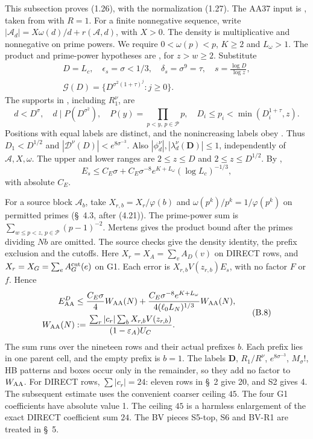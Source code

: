 This subsection proves (1.26), with the normalization (1.27).
The AA37 input is \cite[Theorem~2.6, (2.30)--(2.33b)]{Z1},
taken from \cite[Theorem~4]{ref5} with $R=1$.
For a finite nonnegative sequence, write
$|\mathcal A_d|=X\omega(d)/d+r(\mathcal A,d)$, with $X>0$.
The density is multiplicative and nonnegative on prime powers.
We require $0<\omega(p)<p$, $K\ge2$ and $L_\omega>1$.
The product and prime-power hypotheses are \cite[(2.24), (2.27)]{Z1}, for $z>w\ge2$.
Substitute
\[
 \begin{gathered}
 D=L_c,\quad\epsilon_s=\sigma<1/3,\quad\delta_s=\sigma^9=\tau,\quad s=\frac{\log D}{\log z},\\
 \mathcal G(D)=\{D^{\sigma^2(1+\tau)^j}:j\ge0\}.
 \end{gathered}
\]
The supports in \cite[(2.32)--(2.33)]{Z1}, including $R_1^\nu$, are
\[
 d<D^\sigma,\quad d\mid P(D^{\sigma^2}),\quad
 P(y)=\prod_{p<y,\,p\in\mathcal P}p,\quad
 D_i\le p_i<\min(D_i^{1+\tau},z).
\]
Positions with equal labels are distinct,
and the nonincreasing labels obey \cite[(2.29)]{Z1}.
Thus $D_1<D^{1/2}$ and $|\mathcal D^\nu(D)|<e^{8\sigma^{-3}}$.
Also $|\phi_d^\nu|,|\lambda_d^\nu(\mathbf D)|\le1$, independently of $\mathcal A,X,\omega$.
The upper and lower ranges are $2\le z\le D$ and $2\le z\le D^{1/2}$.
By \cite[(2.31)]{Z1},
\[
 E_s\le C_E\sigma+C_E\sigma^{-8}e^{K+L_\omega}(\log L_c)^{-1/3},
\]
with absolute $C_E$.

For a source block $\mathcal A_b$, take $X_{r,b}=X_r/\varphi(b)$ and
$\omega(p^k)/p^k=1/\varphi(p^k)$ on permitted primes (\S~4.3, after (4.21)).
The prime-power sum is $\sum_{w\le p<z,\,p\in\mathcal P}(p-1)^{-2}$.
Mertens gives the product bound after the primes dividing $Nb$ are omitted.
The source checks give the density identity, the prefix exclusion and the cutoffs.
Here $X_r=X_A=\sum_vA_D(v)$ on DIRECT rows,
and $X_r=X_G=\sum_eA_G^{\rm cut}(e)$ on G1.
Each error is $X_{r,b}V(z_{r,b})E_s$,
with no factor $F$ or $f$.
Hence
\[
\begin{aligned}
 E^D_{\rm AA}&\le\frac{C_E\sigma}4W_{\rm AA}(N)
 +\frac{C_E\sigma^{-8}e^{K+L_\omega}}{4(\ell_0L_N)^{1/3}}W_{\rm AA}(N),\\
 W_{\rm AA}(N)&:=
 \frac{\sum_r|c_r|\sum_bX_{r,b}V(z_{r,b})}{(1-\varepsilon_A)U_C}.
\end{aligned}
 \tag{B.8}
\]
The sum runs over the nineteen rows and their actual prefixes $b$.
Each prefix lies in one parent cell, and the empty prefix is $b=1$.
The labels $\mathbf D$, $R_1/R^\nu$, $e^{8\sigma^{-3}}$, $M_\sigma!$,
HB patterns and boxes occur only in the remainder,
so they add no factor to $W_{\rm AA}$.
For DIRECT rows, $\sum|c_r|=24$: eleven rows in \S~2 give 20, and S2 gives 4.
The subsequent estimate uses the convenient coarser ceiling $45$.
The four G1 coefficients have absolute value 1.
The ceiling $45$ is a harmless enlargement of the exact DIRECT coefficient sum $24$.
The BV pieces S5-top, S6 and BV-R1 are treated in \S~5.

